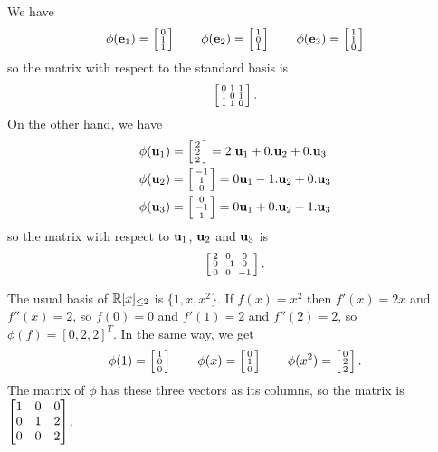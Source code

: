 We have
 \[ \phi(\ve_1) = \bsm 0\\1\\1\esm \hspace{2em}
    \phi(\ve_2) = \bsm 1\\0\\1\esm \hspace{2em}
    \phi(\ve_3) = \bsm 1\\1\\0\esm
 \]
 so the matrix with respect to the standard basis is
 \[ \bsm 0 & 1 & 1 \\ 1 & 0 & 1 \\ 1 & 1 & 0 \esm. \]
 On the other hand, we have
 \begin{align*}
   \phi(\vu_1) &= \bsm 2\\2\\2\esm = 2.\vu_1+0.\vu_2+0.\vu_3 \\
   \phi(\vu_2) &= \bsm -1\\ 1\\ 0\esm = 0\vu_1 - 1.\vu_2 + 0.\vu_3 \\
   \phi(\vu_3) &= \bsm 0\\-1\\ 1\esm = 0\vu_1 + 0.\vu_2 - 1.\vu_3
 \end{align*}
 so the matrix with respect to $\vu_1$, $\vu_2$ and $\vu_3$
 is
 \[ \bsm 2 & 0 & 0 \\ 0 & -1 & 0 \\ 0 & 0 & -1 \esm. \]
\EndDeferredSolution

 The usual basis of $\R[x]_{\leq 2}$ is $\{1,x,x^2\}$.  If
 $f(x)=x^2$ then $f'(x)=2x$ and $f''(x)=2$, so $f(0)=0$ and
 $f'(1)=2$ and $f''(2)=2$, so $\phi(f)=[0,2,2]^T$.  In the same
 way, we get
 \[
  \phi(1)   = \bsm 1\\0\\0\esm \hspace{2em}
  \phi(x)   = \bsm 0\\1\\0\esm \hspace{2em}
  \phi(x^2) = \bsm 0\\2\\2\esm.
 \]
 The matrix of $\phi$ has these three vectors as its columns, so
 the matrix is $\bbm 1&0&0\\ 0&1&2\\ 0&0&2\ebm$.
\EndDeferredSolution

